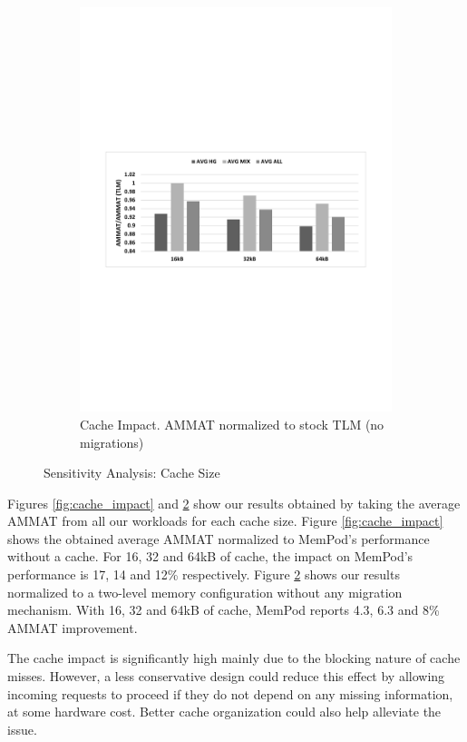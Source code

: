\begin{figure}[h]
\begin{subfigure}[b]{\linewidth}
    	\includegraphics[width=\linewidth]{figures/revised/new/cache_norm_tlm.pdf}
    	\caption{Cache Impact. AMMAT normalized to stock TLM (no migrations)}\label{fig:cache_norm_tlm}
	\end{subfigure}
	\caption{Sensitivity Analysis: Cache Size}
\end{figure}

Figures \ref{fig:cache_impact} and \ref{fig:cache_norm_tlm} show our results obtained by taking the average AMMAT from all our workloads for each cache size. Figure \ref{fig:cache_impact} shows the obtained average AMMAT normalized to MemPod's performance without a cache. For 16, 32 and 64kB of cache, the impact on MemPod's performance is 17, 14 and 12\% respectively. Figure \ref{fig:cache_norm_tlm} shows our results normalized to a two-level memory configuration without any migration mechanism. With 16, 32 and 64kB of cache, MemPod reports 4.3, 6.3 and 8\% AMMAT improvement.

The cache impact is significantly high mainly due to the blocking nature of cache misses. However, a less conservative design could reduce this effect by allowing incoming requests to proceed if they do not depend on any missing information, at some hardware cost. Better cache organization could also help alleviate the issue.

